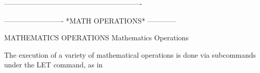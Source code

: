 ----------------------------------------------------------











































































































-------------------------  *MATH OPERATIONS*  ------------
 
MATHEMATICS OPERATIONS
Mathematics Operations
 
The execution of a variety of mathematical operations is done via
subcommands under the LET command, as in
 
